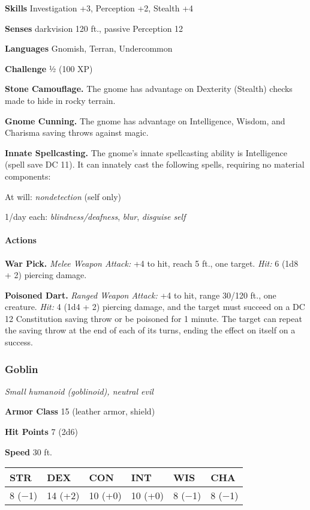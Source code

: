 \documentclass[
]{article}
\begin{document}
\textbf{Skills} Investigation +3, Perception +2, Stealth +4

\textbf{Senses} darkvision 120 ft., passive Perception 12

\textbf{Languages} Gnomish, Terran, Undercommon

\textbf{Challenge} ½ (100 XP)

\textbf{Stone Camouflage.} The gnome has advantage on Dexterity
(Stealth) checks made to hide in rocky terrain.

\textbf{Gnome Cunning.} The gnome has advantage on Intelligence, Wisdom,
and Charisma saving throws against magic.

\textbf{Innate Spellcasting.} The gnome's innate spellcasting ability is
Intelligence (spell save DC 11). It can innately cast the following
spells, requiring no material components:

At will: \emph{nondetection} (self only)

1/day each: \emph{blindness/deafness}, \emph{blur}, \emph{disguise self}

\hypertarget{actions-14}{%
\paragraph{Actions}\label{actions-14}}

\textbf{War Pick.} \emph{Melee Weapon Attack:} +4 to hit, reach 5 ft.,
one target. \emph{Hit:} 6 (1d8 + 2) piercing damage.

\textbf{Poisoned Dart.} \emph{Ranged Weapon Attack:} +4 to hit, range
30/120 ft., one creature. \emph{Hit:} 4 (1d4 + 2) piercing damage, and
the target must succeed on a DC 12 Constitution saving throw or be
poisoned for 1 minute. The target can repeat the saving throw at the end
of each of its turns, ending the effect on itself on a success.

\hypertarget{goblin}{%
\subsubsection{Goblin}\label{goblin}}

\emph{Small humanoid (goblinoid), neutral evil}

\textbf{Armor Class} 15 (leather armor, shield)

\textbf{Hit Points} 7 (2d6)

\textbf{Speed} 30 ft.

\begin{longtable}[]{@{}llllll@{}}
\toprule
STR & DEX & CON & INT & WIS & CHA\tabularnewline
\midrule
\endhead
8 (−1) & 14 (+2) & 10 (+0) & 10 (+0) & 8 (−1) & 8 (−1)\tabularnewline
\bottomrule
\end{longtable}
\end{document}
